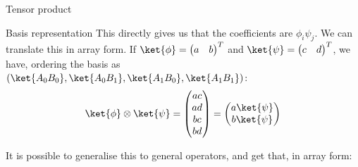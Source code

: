 \documentclass[a4paper]{article}
\begin{document}
\begin{parag}{Tensor product}
\begin{subparag}{Basis representation}
        This directly gives us that the coefficients are $\phi_i \psi_j$. We can translate this in array form. If $\ket{\phi} = \begin{pmatrix} a & b \end{pmatrix} ^T$ and $\ket{\psi} = \begin{pmatrix} c & d \end{pmatrix} ^T$, we have, ordering the basis as $\left(\ket{A_0 B_0}, \ket{A_0 B_1}, \ket{A_1 B_0}, \ket{A_1 B_1}\right)$:
        \[\ket{\phi} \otimes \ket{\psi} = \begin{pmatrix} ac \\ ad \\ bc \\ bd \end{pmatrix} = \begin{pmatrix} a \ket{\psi} \\ b \ket{\psi} \end{pmatrix} \]
        
        It is possible to generalise this to general operators, and get that, in array form:
    \end{subparag}
\end{parag}
\end{document}
